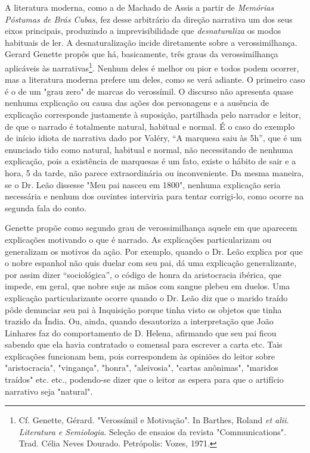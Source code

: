 A literatura moderna, como a de Machado de Assis a partir de
\emph{Memórias Póstumas de Brás Cubas}, fez desse arbitrário da direção
narrativa um dos seus eixos principais, produzindo a imprevisibilidade
que \emph{desnaturaliza} os modos habituais de ler. A desnaturalização
incide diretamente sobre a verossimilhança. Gerard Genette propôs que
há, basicamente, três graus da verossimilhança aplicáveis às
narrativas\footnote{Cf. Genette, Gérard. "Verossímil e Motivação". In
  Barthes, Roland \emph{et alii}. \emph{Literatura e Semiologia}.
  Seleção de ensaios da revista "Communications". Trad. Célia Neves
  Dourado. Petrópolis: Vozes, 1971.}. Nenhum deles é melhor ou pior e
todos podem ocorrer, mas a literatura moderna prefere um deles, como se
verá adiante. O primeiro caso é o de um "grau zero" de marcas do
verossímil. O discurso não apresenta quase nenhuma explicação ou causa
das ações dos personagens e a ausência de explicação corresponde
justamente à suposição, partilhada pelo narrador e leitor, de que o
narrado é totalmente natural, habitual e normal. É o caso do exemplo de
início idiota de narrativa dado por Valéry, ``A marquesa saiu às 5h'',
que é um enunciado tido como natural, habitual e normal, não
necessitando de nenhuma explicação, pois a existência de marquesas é um
fato, existe o hábito de sair e a hora, 5 da tarde, não parece
extraordinária ou inconveniente. Da mesma maneira, se o Dr. Leão
dissesse "Meu pai nasceu em 1800", nenhuma explicação seria necessária e
nenhum dos ouvintes interviria para tentar corrigi-lo, como ocorre na
segunda fala do conto.

Genette propõe como segundo grau de verossimilhança aquele em que
aparecem explicações motivando o que é narrado. As explicações
particularizam ou generalizam os motivos da ação. Por exemplo, quando o
Dr. Leão explica por que o nobre espanhol não quis duelar com seu pai,
dá uma explicação generalizante, por assim dizer ``sociológica'', o
código de honra da aristocracia ibérica, que impede, em geral, que nobre
suje as mãos com sangue plebeu em duelos. Uma explicação
particularizante ocorre quando o Dr. Leão diz que o marido traído pôde
denunciar seu pai à Inquisição porque tinha visto os objetos que tinha
trazido da Índia. Ou, ainda, quando desautoriza a interpretação que João
Linhares faz do comportamento de D. Helena, afirmando que seu pai ficou
sabendo que ela havia contratado o comensal para escrever a carta etc.
Tais explicações funcionam bem, pois correspondem às opiniões do leitor
sobre "aristocracia", "vingança", "honra", "aleivosia", "cartas
anônimas", "maridos traídos" etc. etc., podendo-se dizer que o leitor as
espera para que o artifício narrativo seja "natural".

